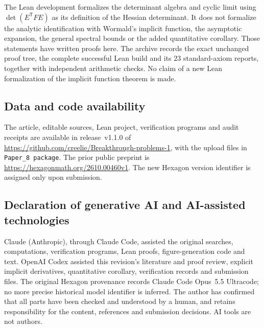 \documentclass[11pt]{amsart}
\theoremstyle{remark}
\numberwithin{equation}{section}
\newcommand{\T}{\mathsf{T}}
\begin{document}
The Lean development formalizes the determinant algebra and cyclic limit using $\det(E^\T FE)$ as its definition of the Hessian determinant. It does not formalize the analytic identification with Wormald's implicit function, the asymptotic expansion, the general spectral bounds or the added quantitative corollary. Those statements have written proofs here. The archive records the exact unchanged proof tree, the complete successful Lean build and its $23$ standard-axiom reports, together with independent arithmetic checks. No claim of a new Lean formalization of the implicit function theorem is made.

\subsection*{Data and code availability}
The article, editable sources, Lean project, verification programs and audit receipts are available in release~v1.1.0 of \url{https://github.com/creelie/Breakthrough-problems-1}, with the upload files in \texttt{Paper\_8 package}. The prior public preprint is \url{https://hexagonmath.org/2610.00460v1}. The new Hexagon version identifier is assigned only upon submission.

\subsection*{Declaration of generative AI and AI-assisted technologies}
Claude (Anthropic), through Claude Code, assisted the original searches, computations, verification programs, Lean proofs, figure-generation code and text. OpenAI Codex assisted this revision's literature and proof review, explicit implicit derivatives, quantitative corollary, verification records and submission files. The original Hexagon provenance records Claude Code Opus~5.5 Ultracode; no more precise historical model identifier is inferred. The author has confirmed that all parts have been checked and understood by a human, and retains responsibility for the content, references and submission decisions. AI tools are not authors.
\end{document}

